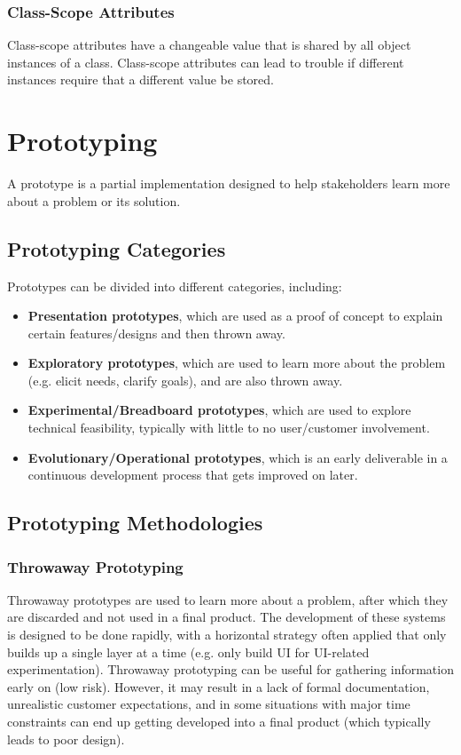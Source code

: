 \documentclass[12pt,titlepage]{article}
\let\stdsection\section
\renewcommand\section{\clearpage\stdsection}
\begin{document}
      \subsubsection{Class-Scope Attributes}
        Class-scope attributes have a changeable value that is shared by all object instances of a class. Class-scope attributes can lead to trouble if different instances require
        that a different value be stored.

  \section{Prototyping}
    A prototype is a partial implementation designed to help stakeholders learn more about a problem or its solution.

    \subsection{Prototyping Categories}
      Prototypes can be divided into different categories, including:
      \begin{itemize}
        \item \textbf{Presentation prototypes}, which are used as a proof of concept to explain certain features/designs and then thrown away.
        \item \textbf{Exploratory prototypes}, which are used to learn more about the problem (e.g. elicit needs, clarify goals), and are also thrown away.
        \item \textbf{Experimental/Breadboard prototypes}, which are used to explore technical feasibility, typically with little to no user/customer involvement.
        \item \textbf{Evolutionary/Operational prototypes}, which is an early deliverable in a continuous development process that gets improved on later.
      \end{itemize}

    \subsection{Prototyping Methodologies}

      \subsubsection{Throwaway Prototyping}
        Throwaway prototypes are used to learn more about a problem, after which they are discarded and not used in a final product. The development of these systems is designed to be
        done rapidly, with a horizontal strategy often applied that only builds up a single layer at a time (e.g. only build UI for UI-related experimentation). Throwaway prototyping can
        be useful for gathering information early on (low risk). However, it may result in a lack of formal documentation, unrealistic customer expectations, and in some situations with
        major time constraints can end up getting developed into a final product (which typically leads to poor design).
\end{document}
